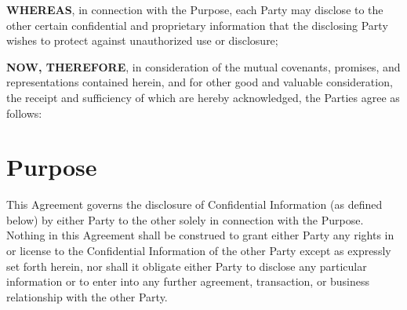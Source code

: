 \textbf{WHEREAS}, in connection with the Purpose, each Party may disclose to the other certain confidential and proprietary information that the disclosing Party wishes to protect against unauthorized use or disclosure;

\textbf{NOW, THEREFORE}, in consideration of the mutual covenants, promises, and representations contained herein, and for other good and valuable consideration, the receipt and sufficiency of which are hereby acknowledged, the Parties agree as follows:

\section{Purpose}

This Agreement governs the disclosure of Confidential Information (as defined below) by either Party to the other solely in connection with the Purpose. Nothing in this Agreement shall be construed to grant either Party any rights in or license to the Confidential Information of the other Party except as expressly set forth herein, nor shall it obligate either Party to disclose any particular information or to enter into any further agreement, transaction, or business relationship with the other Party.
